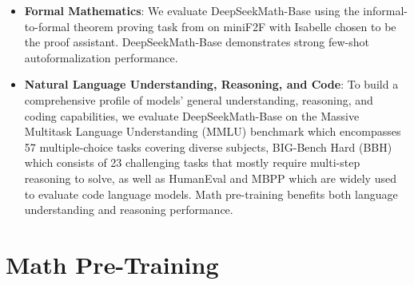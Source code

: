 \documentclass[11pt, a4paper, logo, copyright, nonumbering]{deepseek}
\newcommand{\spmath}{DeepSeekMath}
\begin{document}
\begin{CJK*}{UTF8}{gbsn}
\begin{itemize}[topsep=0pt]
    On English benchmarks, \spmath-Base is competitive with the closed-source Minerva 540B \citep{minerva}, and surpasses all open-source base models (e.g., Mistral 7B \citep{mistral} and Llemma-34B \citep{llemma}), regardless of whether they've undergone math pre-training or not, often by a significant margin.
    Notably, \spmath-Base is superior on Chinese benchmarks, likely because we don't follow previous works \citep{minerva,llemma} to collect English-only math pre-training data, and also include high-quality non-English ones.
    With mathematical instruction tuning and reinforcement learning, the resulting \spmath-Instruct and \spmath-RL demonstrate strong performance, obtaining an accuracy of over 50\% on the competition-level MATH dataset for the first time within the open-source community.
    \item \textbf{Formal Mathematics}:
    We evaluate \spmath-Base using the informal-to-formal theorem proving task from \citep{dsp_proof} on miniF2F \citep{minif2f} with Isabelle \citep{isabelle} chosen to be the proof assistant.
    \spmath-Base demonstrates strong few-shot autoformalization performance.
    \item \textbf{Natural Language Understanding, Reasoning, and Code}:
    To build a comprehensive profile of models' general understanding, reasoning, and coding capabilities, we evaluate \spmath-Base on the Massive Multitask Language Understanding (MMLU) benchmark \citep{mmlu} which encompasses 57 multiple-choice tasks covering diverse subjects, BIG-Bench Hard (BBH) \citep{bbh} which consists of 23 challenging tasks that mostly require multi-step reasoning to solve, as well as HumanEval \citep{codex} and MBPP \citep{mbpp} which are widely used to evaluate code language models.
    Math pre-training benefits both language understanding and reasoning performance.
\end{itemize}

\section{Math Pre-Training}


\end{CJK*}
\end{document}
